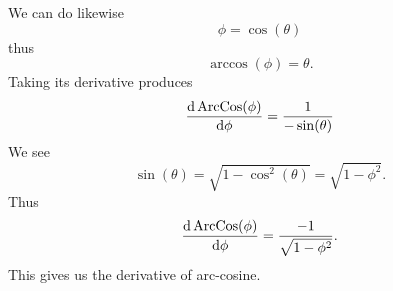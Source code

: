 We can do likewise
\begin{equation}
\phi=\cos(\theta)
\end{equation}
thus
\begin{equation}
\arccos(\phi) = \theta.
\end{equation}
Taking its derivative produces
\begin{equation}
\frac{\mathrm{d}\mathop{\mathrm{ArcCos}}\nolimits(\phi)}{\mathrm{d}\phi}=\frac{1}{-\sin(\theta)}
\end{equation}
We see
\begin{equation}
\sin(\theta) = \sqrt{1-\cos^{2}(\theta)}=\sqrt{1-\phi^{2}}.
\end{equation}
Thus
\begin{equation}
\frac{\mathrm{d}\mathop{\mathrm{ArcCos}}\nolimits(\phi)}{\mathrm{d}\phi}=\frac{-1}{\sqrt{1-\phi^{2}}}.
\end{equation}
This gives us the derivative of arc-cosine.
